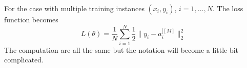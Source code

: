 \documentclass[../main.tex]{subfiles}
\begin{document}
            For the case with multiple training instances $(x_i, y_i)$, $i=1,\dots,N$. The loss function becomes
            \[
                L(\theta) = \frac{1}{N} \sum_{i=1}^N \frac{1}{2} \|y_i - a_i^{[ [M] }\|_2^2    
            \]
            The computation are all the same but the notation will become a little bit complicated.
\end{document}

